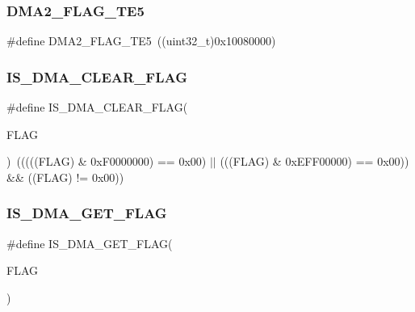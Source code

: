 \subsubsection{\texorpdfstring{DMA2\_FLAG\_TE5}{DMA2\_FLAG\_TE5}}
{\footnotesize\ttfamily \#define D\+M\+A2\+\_\+\+F\+L\+A\+G\+\_\+\+T\+E5~((uint32\+\_\+t)0x10080000)}

\mbox{\label{group___d_m_a__flags__definition_ga4b33e418489c9a3c9adcbdbaca93e4a3}} 
\subsubsection{\texorpdfstring{IS\_DMA\_CLEAR\_FLAG}{IS\_DMA\_CLEAR\_FLAG}}
{\footnotesize\ttfamily \#define I\+S\+\_\+\+D\+M\+A\+\_\+\+C\+L\+E\+A\+R\+\_\+\+F\+L\+AG(\begin{DoxyParamCaption}\item[{}]{F\+L\+AG }\end{DoxyParamCaption})~(((((F\+L\+AG) \& 0x\+F0000000) == 0x00) $\vert$$\vert$ (((\+F\+L\+A\+G) \& 0x\+E\+F\+F00000) == 0x00)) \&\& ((\+F\+L\+A\+G) != 0x00))}

\mbox{\label{group___d_m_a__flags__definition_ga98e421aa0a15fbeecb4cab3612985676}} 
\subsubsection{\texorpdfstring{IS\_DMA\_GET\_FLAG}{IS\_DMA\_GET\_FLAG}}
{\footnotesize\ttfamily \#define I\+S\+\_\+\+D\+M\+A\+\_\+\+G\+E\+T\+\_\+\+F\+L\+AG(\begin{DoxyParamCaption}\item[{}]{F\+L\+AG }\end{DoxyParamCaption})}

